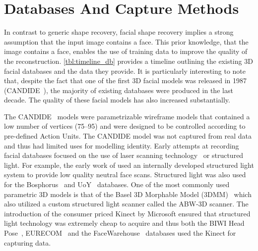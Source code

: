 \section{Databases And Capture Methods}\label{ch:bg_db_capture}
In contrast to generic shape recovery, facial shape recovery implies a strong
assumption that the input image contains a face. This prior knowledge, that the
image contains a face, enables the use of training data to improve the
quality of the reconstruction. \cref{tbl:timeline_db} provides a
timeline outlining the existing 3D facial databases and the data they provide.
It is particularly interesting to note that, despite the fact that one of the
first 3D facial models was released in 1987 (CANDIDE~\cite{Rydfalk:1987tg}), the
majority of existing databases were produced in the last decade. The quality
of these facial models has also increased substantially. 

The CANDIDE~\cite{Rydfalk:1987tg,Ahlberg:1998uk} models were parametrizable
wireframe models that contained a low number of vertices (75--95) and were
designed to be controlled according to pre-defined Action Units. The CANDIDE
model was not captured from real data and thus had limited uses for modelling
identity. Early attempts at recording facial databases focused on the use
of laser scanning technology~\cite{cyberware,minolta} or structured light. For
example, the early work of \citep{beumier2001face} used an internally developed 
structured light system to provide low quality neutral face scans. Structured
light was also used for the Bosphorus~\cite{Savran:2008gg} 
and UoY~\cite{heseltine2008three} databases. One of the most commonly used
parametric 3D models is that of the Basel 3D Morphable Model 
(3DMM)~\cite{paysan20093d} which also utilized a custom structured light
scanner called the ABW-3D scanner. The introduction of the consumer priced
Kinect by Microsoft ensured that structured light technology was extremely 
cheap to acquire and thus both the BIWI Head Pose~\cite{fanelli2013random}, 
EURECOM~\cite{min2014kinectfacedb} and the FaceWarehouse~\cite{Cao:2014gy} 
databases used the Kinect for capturing data.

